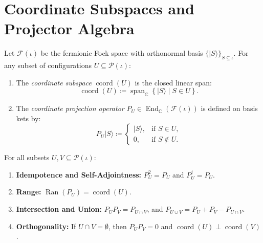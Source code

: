 \section{Coordinate Subspaces and Projector Algebra}

\begin{definition}
Let $\mathcal{F}(\iota)$ be the fermionic Fock space with orthonormal basis $\{|S\rangle\}_{S \subseteq \iota}$.
For any subset of configurations $U \subseteq \mathcal{P}(\iota)$:
\begin{enumerate}
    \item The \emph{coordinate subspace} $\operatorname{coord}(U)$ is the closed linear span:
    \begin{equation}
    \operatorname{coord}(U) \coloneqq \operatorname{span}_{\mathbb{C}} \left\{ |S\rangle \mid S \in U \right\}.
    \end{equation}
    \item The \emph{coordinate projection operator} $P_U \in \operatorname{End}_{\mathbb{C}}(\mathcal{F}(\iota))$ is defined on basis kets by:
    \begin{equation}
    P_U |S\rangle \coloneqq \begin{cases} |S\rangle, & \text{if } S \in U, \\ 0, & \text{if } S \notin U. \end{cases}
    \end{equation}
\end{enumerate}
\end{definition}

\begin{theorem}
\label{thm:app_projector_properties}
For all subsets $U, V \subseteq \mathcal{P}(\iota)$:
\begin{enumerate}
    \item \textbf{Idempotence and Self-Adjointness:} $P_U^2 = P_U$ and $P_U^\dagger = P_U$.
    \item \textbf{Range:} $\operatorname{Ran}(P_U) = \operatorname{coord}(U)$.
    \item \textbf{Intersection and Union:} $P_U P_V = P_{U \cap V}$, and $P_{U \cup V} = P_U + P_V - P_{U \cap V}$.
    \item \textbf{Orthogonality:} If $U \cap V = \emptyset$, then $P_U P_V = 0$ and $\operatorname{coord}(U) \perp \operatorname{coord}(V)$.
\end{enumerate}
\end{theorem}

